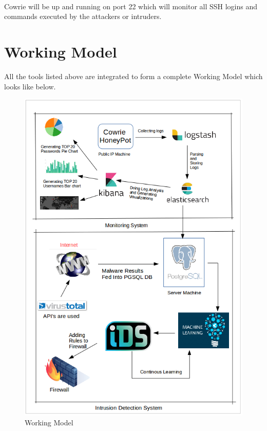 \documentclass{report}
\begin{document}
\paragraph{}
Cowrie will be up and running on port 22 which will monitor all SSH logins and commands executed by the attackers or intruders.


\section{Working Model}

All the tools listed above are integrated to form a complete Working Model which looks like below.

\begin{figure}[H]
\centering
\caption{Working Model}
\includegraphics[scale=0.55]{Working_Model}
\end{figure}
\end{document}
